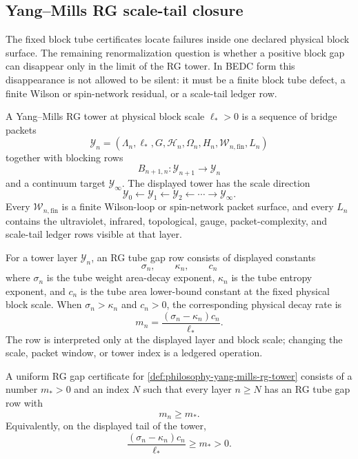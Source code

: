 \subsection{Yang--Mills RG scale-tail closure}
\label{subsec:philosophy-yang-mills-rg-scale-tail-closure}

The fixed block tube certificates locate failures inside one declared
physical block surface. The remaining renormalization question is whether a
positive block gap can disappear only in the limit of the RG tower. In BEDC
form this disappearance is not allowed to be silent: it must be a finite
block tube defect, a finite Wilson or spin-network residual, or a scale-tail
ledger row.

\begin{definition}
\label{def:philosophy-yang-mills-rg-tower}
A Yang--Mills RG tower at physical block scale $\ell_{\ast}>0$ is a sequence
of bridge packets
$$
\mathcal Y_n=
(\Lambda_n,\ell_{\ast},G,\mathcal H_n,\Omega_n,H_n,
\mathcal W_{n,\mathrm{fin}},L_n)
$$
together with blocking rows
$$
B_{n+1,n}:\mathcal Y_{n+1}\longrightarrow\mathcal Y_n
$$
and a continuum target $\mathcal Y_{\infty}$. The displayed tower has the
scale direction
$$
\mathcal Y_0\leftarrow\mathcal Y_1\leftarrow\mathcal Y_2
\leftarrow\cdots\longrightarrow\mathcal Y_{\infty}.
$$
Every $\mathcal W_{n,\mathrm{fin}}$ is a finite Wilson-loop or spin-network
packet surface, and every $L_n$ contains the ultraviolet, infrared,
topological, gauge, packet-complexity, and scale-tail ledger rows visible at
that layer.
\end{definition}

\begin{definition}
\label{def:philosophy-rg-tube-gap-row}
For a tower layer $\mathcal Y_n$, an RG tube gap row consists of displayed
constants
$$
\sigma_n,\qquad \kappa_n,\qquad c_n
$$
where $\sigma_n$ is the tube weight area-decay exponent, $\kappa_n$ is the
tube entropy exponent, and $c_n$ is the tube area lower-bound constant at
the fixed physical block scale. When $\sigma_n>\kappa_n$ and $c_n>0$, the
corresponding physical decay rate is
$$
m_n=\frac{(\sigma_n-\kappa_n)c_n}{\ell_{\ast}}.
$$
The row is interpreted only at the displayed layer and block scale; changing
the scale, packet window, or tower index is a ledgered operation.
\end{definition}

\begin{definition}
\label{def:philosophy-uniform-rg-gap-certificate}
A uniform RG gap certificate for
\autoref{def:philosophy-yang-mills-rg-tower} consists of a number
$m_{\ast}>0$ and an index $N$ such that every layer $n\ge N$ has an RG tube
gap row with
$$
m_n\ge m_{\ast}.
$$
Equivalently, on the displayed tail of the tower,
$$
\frac{(\sigma_n-\kappa_n)c_n}{\ell_{\ast}}\ge m_{\ast}>0.
$$
\end{definition}

